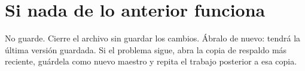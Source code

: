 \section{Si nada de lo anterior funciona}
\begin{pasos}
\paso No guarde. Cierre el archivo sin guardar los cambios.
\paso Ábralo de nuevo: tendrá la última versión guardada.
\paso Si el problema sigue, abra la copia de respaldo más reciente, guárdela como nuevo maestro y repita el trabajo posterior a esa copia.
\end{pasos}

